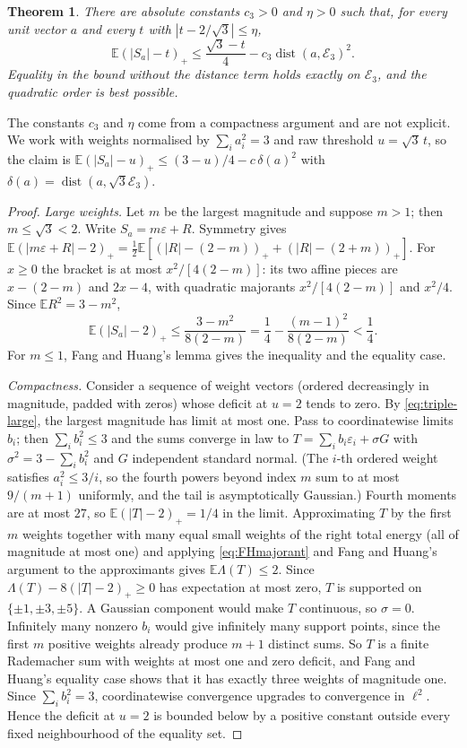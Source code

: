 \documentclass[11pt,a4paper]{article}
\numberwithin{equation}{section}
\newtheorem{theorem}{Theorem}[section]
\theoremstyle{remark}
\newcommand{\E}{\mathbb E}
\newcommand{\dist}{\operatorname{dist}}
\begin{document}
\begin{theorem}\label{thm:triadic}
There are absolute constants $c_3>0$ and $\eta>0$ such that, for every unit
vector $a$ and every $t$ with $|t-2/\sqrt3|\le\eta$,
\[
 \E(|S_a|-t)_+\le\frac{\sqrt3-t}{4}-c_3\dist(a,\mathcal E_3)^2 .
\]
Equality in the bound without the distance term holds exactly on
$\mathcal E_3$, and the quadratic order is best possible.
\end{theorem}

The constants $c_3$ and $\eta$ come from a compactness argument and are not
explicit. We work with weights normalised by $\sum_ia_i^2=3$ and raw
threshold $u=\sqrt3\,t$, so the claim is
$\E(|S_a|-u)_+\le(3-u)/4-c\,\delta(a)^2$ with $\delta(a)=\dist(a,\sqrt3\mathcal E_3)$.

\begin{proof}
\emph{Large weights.} Let $m$ be the largest magnitude and suppose $m>1$;
then $m\le\sqrt3<2$. Write $S_a=m\varepsilon+R$. Symmetry gives
$\E(|m\varepsilon+R|-2)_+=\tfrac12\E[(|R|-(2-m))_++(|R|-(2+m))_+]$. For
$x\ge0$ the bracket is at most $x^2/[4(2-m)]$: its two affine pieces are
$x-(2-m)$ and $2x-4$, with quadratic majorants $x^2/[4(2-m)]$ and $x^2/4$.
Since $\E R^2=3-m^2$,
\begin{equation}\label{eq:triple-large}
 \E(|S_a|-2)_+\le\frac{3-m^2}{8(2-m)}=\frac14-\frac{(m-1)^2}{8(2-m)}<\frac14 .
\end{equation}
For $m\le1$, Fang and Huang's lemma gives the inequality and the equality
case.

\emph{Compactness.} Consider a sequence of weight vectors (ordered
decreasingly in magnitude, padded with zeros) whose deficit at $u=2$ tends
to zero. By \eqref{eq:triple-large}, the largest magnitude has limit at most
one. Pass to coordinatewise limits $b_i$; then $\sum_ib_i^2\le3$ and the
sums converge in law to
$T=\sum_ib_i\varepsilon_i+\sigma G$ with $\sigma^2=3-\sum_ib_i^2$ and $G$
independent standard normal. (The $i$-th ordered weight satisfies
$a_i^2\le3/i$, so the fourth powers beyond index $m$ sum to at most
$9/(m+1)$ uniformly, and the tail is asymptotically Gaussian.) Fourth
moments are at most $27$, so $\E(|T|-2)_+=1/4$ in the limit. Approximating
$T$ by the first $m$ weights together with many equal small weights of the
right total energy (all of magnitude at most one) and applying
\eqref{eq:FHmajorant} and Fang and Huang's argument to the approximants
gives $\E\Lambda(T)\le2$. Since $\Lambda(T)-8(|T|-2)_+\ge0$ has expectation
at most zero, $T$ is supported on $\{\pm1,\pm3,\pm5\}$. A Gaussian component
would make $T$ continuous, so $\sigma=0$. Infinitely many nonzero $b_i$ would
give infinitely many support points, since the first $m$ positive weights
already produce $m+1$ distinct sums. So $T$ is a finite Rademacher sum with
weights at most one and zero deficit, and Fang and Huang's equality case
shows that it has exactly three weights of magnitude one. Since
$\sum_ib_i^2=3$, coordinatewise convergence upgrades to convergence in
$\ell^2$. Hence the deficit at $u=2$ is bounded below by a positive
constant outside every fixed neighbourhood of the equality set.


\end{proof}
\end{document}
